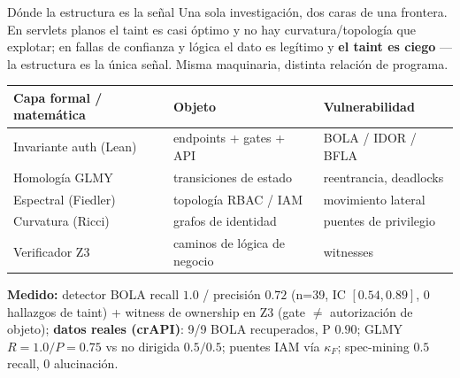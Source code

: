 \documentclass[aspectratio=169,11pt]{beamer}
\begin{document}
\begin{frame}{Dónde la estructura es la señal}
  Una sola investigación, dos caras de una frontera. En servlets planos el taint
  es casi óptimo y no hay curvatura/topología que explotar; en fallas de confianza
  y lógica el dato es legítimo y \textbf{el taint es ciego} --- la estructura es la
  única señal. Misma maquinaria, distinta relación de programa.
  \begin{center}
  \small
  \begin{tabular}{lll}
  \toprule
  \textbf{Capa formal / matemática} & \textbf{Objeto} & \textbf{Vulnerabilidad} \\
  \midrule
  Invariante auth (Lean) & endpoints + gates + API & BOLA / IDOR / BFLA \\
  Homología GLMY & transiciones de estado & reentrancia, deadlocks \\
  Espectral (Fiedler) & topología RBAC / IAM & movimiento lateral \\
  Curvatura (Ricci) & grafos de identidad & puentes de privilegio \\
  Verificador Z3 & caminos de lógica de negocio & witnesses \\
  \bottomrule
  \end{tabular}
  \end{center}
  \vspace{1mm}
  \textbf{Medido:} detector BOLA recall $1.0$ / precisión $0.72$ (n=39, IC
  $[0.54,0.89]$, 0 hallazgos de taint) + witness de ownership en Z3 (gate $\neq$
  autorización de objeto); \textbf{datos reales (crAPI)}: 9/9 BOLA recuperados, P
  $0.90$; GLMY $R{=}1.0/P{=}0.75$ vs no dirigida $0.5/0.5$; puentes IAM vía
  $\kappa_F$; spec-mining $0.5$ recall, $0$ alucinación.
\end{frame}
\end{document}
